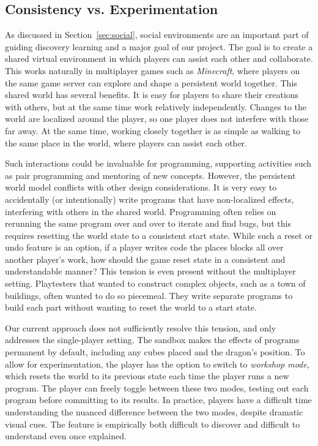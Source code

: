 \documentclass{sig-alternate}
\begin{document}
\subsection{Consistency vs. Experimentation}
\label{sec:multiplayer}

As discussed in Section~\ref{sec:social}, social environments are an important part of guiding discovery learning and a major goal of our project.
The goal is to create a shared virtual environment in which players can assist each other and collaborate.
This works naturally in multiplayer games such as \emph{Minecraft}, where players on the same game server can explore and shape a persistent world together.
This shared world has several benefits.
It is easy for players to share their creations with others, but at the same time work relatively independently.
Changes to the world are localized around the player, so one player does not interfere with those far away.
At the same time, working closely together is as simple as walking to the same place in the world, where players can assist each other.

Such interactions could be invaluable for programming, supporting activities such as pair programming and mentoring of new concepts.
However, the persistent world model conflicts with other design considerations.
It is very easy to accidentally (or intentionally) write programs that have non-localized effects, interfering with others in the shared world.
Programming often relies on rerunning the same program over and over to iterate and find bugs, but this requires resetting the world state to a consistent start state.
While such a reset or undo feature is an option, if a player writes code the places blocks all over another player's work, how should the game reset state in a consistent and understandable manner?
This tension is even present without the multiplayer setting.
Playtesters that wanted to construct complex objects, such as a town of buildings, often wanted to do so piecemeal. They write separate programs to build each part without wanting to reset the world to a start state.

Our current approach does not sufficiently resolve this tension, and only addresses the single-player setting.
The sandbox makes the effects of programs permanent by default, including any cubes placed and the dragon's position.
To allow for experimentation, the player has the option to switch to \emph{workshop mode}, which resets the world to its previous state each time the player runs a new program. 
The player can freely toggle between these two modes, testing out each program before committing to its results. 
In practice, players have a difficult time understanding the nuanced difference between the two modes, despite dramatic visual cues.
The feature is empirically both difficult to discover and difficult to understand even once explained.
\end{document}
